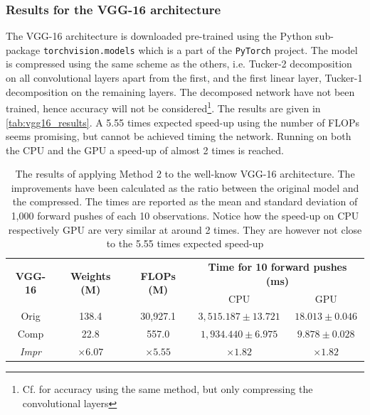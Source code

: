 \subsubsection{Results for the VGG-16 architecture}
The VGG-16 architecture is downloaded pre-trained using the Python sub-package \texttt{torchvision.models} which is a part of the \texttt{PyTorch} project\cite{torchvision}. The model is compressed using the same scheme as the others, i.e. Tucker-2 decomposition on all convolutional layers apart from the first, and the first linear layer, Tucker-1 decomposition on the remaining layers. The decomposed network have not been trained, hence accuracy will not be considered\footnote{Cf. \cite{Kim2016} for accuracy using the same method, but only compressing the convolutional layers}. The results are given in \autoref{tab:vgg16_results}. A 5.55 times expected speed-up using the number of FLOPs seems promising, but cannot be achieved timing the network. Running on both the CPU and the GPU a speed-up of almost 2 times is reached.
\begin{table}[H]
\centering
\captionsetup{width=.95\linewidth}
\caption{The results of applying Method 2 to the well-know VGG-16 architecture. The improvements have been calculated as the ratio between the original model and the compressed. The times are reported as the mean and standard deviation of 1,000 forward pushes of each 10 observations. Notice how the speed-up on CPU respectively GPU are very similar at around 2 times. They are however not close to the 5.55 times expected speed-up}
\label{tab:vgg16_results}
\begin{tabular}{c|cccc}
\multirow{2}{*}{\textbf{VGG-16}} & \multirow{2}{*}{\textbf{Weights (M)}} & \multirow{2}{*}{\textbf{FLOPs (M)}} & \multicolumn{2}{c}{\textbf{Time for 10 forward pushes (ms)}} \\
                                 &                                       &                                     & CPU                          & GPU                        \\ \hline
Orig                             & 138.4                                 & 30,927.1                            & $3,515.187 \pm 13.721 $        & $18.013 \pm 0.046 $        \\
Comp                             & 22.8                                  & 557.0                               & $1,934.440 \pm 6.975$       & $ 9.878 \pm 0.028 $        \\
\textit{Impr}                    & $ \times 6.07 $                       & $\times 5.55$                       & $\times 1.82 $               & $ \times 1.82 $           
\end{tabular}
\end{table}
